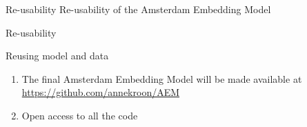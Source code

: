 \documentclass{beamer}
\begin{document}
\begin{frame}{}
\end{frame}




\begin{frame}{Re-usability}
Re-usability of the Amsterdam Embedding Model
\end{frame}

\begin{frame}{Re-usability}
\begin{block}{Reusing model and data}
\begin{enumerate}
\item The final Amsterdam Embedding Model will be made available at \url{https://github.com/annekroon/AEM}
\item Open access to all the code
\end{enumerate}
\end{block}
\end{frame}
\end{document}
